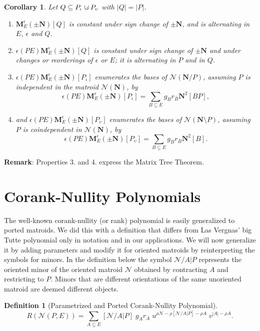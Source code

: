 \documentclass[12pt]{article}
\newtheorem{corollary}[theorem]{Corollary}
\theoremstyle{definition}
\newtheorem{definition}[theorem]{Definition}
\newcommand{\Remark}{\textbf{Remark}}
\newcommand{\MVAR}[1]{{[#1]\;}}
\newcommand{\dunion}
{\mbox{\hbox{\hskip6pt$\cdot$\hskip-5.50pt$\cup$\hskip2pt}}}
\newcommand{\scomp}[1]{\ensuremath{\overline{#1}}}
\newcommand{\Is}{\ensuremath{\iota}}
\newcommand{\Vs}{\ensuremath{\upsilon}}
\newcommand{\Rank}{{\rho}}%
\newcommand{\Card}[1]{\ensuremath{{\left|#1\right|}}}
\newcommand{\ext}[1]{\ensuremath{\mathbf{#1}}}
\begin{document}
\begin{corollary}
\label{BasisCountCorollary}
Let $Q\subseteq P_{\Is}\dunion P_{\Vs}$ with $\Card{Q}=\Card{P}$.
\begin{enumerate}
\item $\ext{M}^\epsilon_E(\pm \ext{N})[Q]$ is constant under sign change of
$\pm \ext{N}$, and is alternating in $E$, $\epsilon$ and $Q$.
\item $\epsilon(PE)\ext{M}^\epsilon_E(\pm \ext{N})[Q]$ 
is constant under sign
change of $\pm \ext{N}$ and under changes or reorderings of 
$\epsilon$ or  $E$; it
is alternating in $P$ and in $Q$.
\item $\epsilon(PE)\ext{M}^\epsilon_E(\pm \ext{N})[P_{\Is}]$
enumerates the bases of
$\mathcal{N}(\ext{N}/P)$, assuming $P$ is independent in the matroid 
$\mathcal{N}(\ext{N})$, by
\[
\epsilon(PE)\ext{M}^\epsilon_E(\pm \ext{N})[P_{\Is}]=
\sum_{B\subseteq E} g_Br_{\scomp{B}}\ext{N}^2[BP],
\]
\item and $\epsilon(PE)\ext{M}^\epsilon_E(\pm \ext{N})[P_{\Vs}]$ 
enumerates the bases of
$\mathcal{N}(\ext{N}\setminus P)$,  
assuming $P$ is coindependent in 
$\mathcal{N}(\ext{N})$, by\[
\epsilon(PE)\ext{M}^\epsilon_E(\pm \ext{N})[P_{\Vs}]=
\sum_{B\subseteq E} g_Br_{\scomp{B}}\ext{N}^2[B].
\]
\end{enumerate}
\end{corollary}

\Remark: Properties 3. and 4. express the Matrix Tree Theorem.

\section{Corank-Nullity Polynomials}
\label{Classify}

The well-known corank-nullity (or rank) polynomial is easily
generalized to ported matroids.  
We did\cite{sdcPorted} this
with a definition that differs from 
Las Vergnas' 
big Tutte polynomial \cite{SetPointedLV}
only in notation and in our applications.
We will now generalize it by adding parameters and modify it
for oriented matroids by reinterpreting the symbols
for minors.
In the definition below
the symbol $\mathcal{N}/A|P$ represents the oriented minor
of the oriented matroid $\mathcal{N}$ obtained by contracting
$A$ and restricting to $P$.  Minors that are
different orientations of the same unoriented matroid are deemed
different objects.

\begin{definition}[Parametrized and Ported Corank-Nullity Polynomial]
\label{definitionRankPoly}
\[
R(\mathcal{N}(P,E))=\sum_{A\subseteq E}
	\MVAR{\mathcal{N}/A|P}g_Ar_{\scomp{A}}\;
	u^{\Rank{\mathcal{N}}-\Rank{[\mathcal{N}/A|P]}-\Rank{A}}\;
	v^{\Card{A}-\Rank{A}}.
\]
\end{definition}
\end{document}
